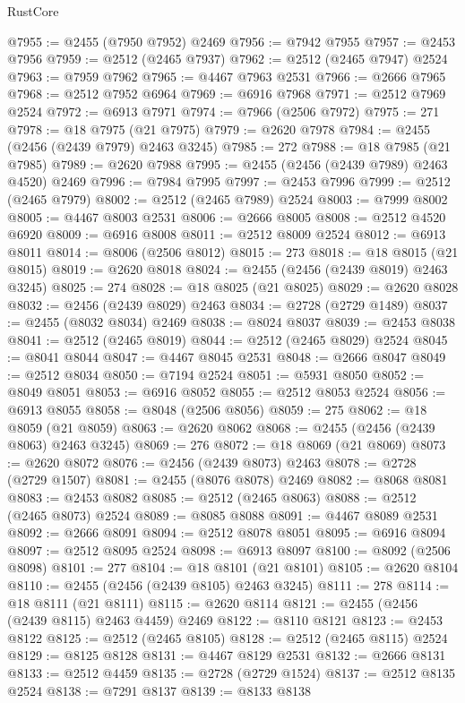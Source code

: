 \begin{lexlean}{RustCore}
\begin{coremodule}
@7955 := @2455 (@7950 @7952) @2469
@7956 := @7942 @7955
@7957 := @2453 @7956
@7959 := @2512 (@2465 @7937)
@7962 := @2512 (@2465 @7947) @2524
@7963 := @7959 @7962
@7965 := @4467 @7963 @2531
@7966 := @2666 @7965
@7968 := @2512 @7952 @6964
@7969 := @6916 @7968
@7971 := @2512 @7969 @2524
@7972 := @6913 @7971
@7974 := @7966 (@2506 @7972)
@7975 := 271
@7978 := @18 @7975 (@21 @7975)
@7979 := @2620 @7978
@7984 := @2455 (@2456 (@2439 @7979) @2463 @3245)
@7985 := 272
@7988 := @18 @7985 (@21 @7985)
@7989 := @2620 @7988
@7995 := @2455 (@2456 (@2439 @7989) @2463 @4520) @2469
@7996 := @7984 @7995
@7997 := @2453 @7996
@7999 := @2512 (@2465 @7979)
@8002 := @2512 (@2465 @7989) @2524
@8003 := @7999 @8002
@8005 := @4467 @8003 @2531
@8006 := @2666 @8005
@8008 := @2512 @4520 @6920
@8009 := @6916 @8008
@8011 := @2512 @8009 @2524
@8012 := @6913 @8011
@8014 := @8006 (@2506 @8012)
@8015 := 273
@8018 := @18 @8015 (@21 @8015)
@8019 := @2620 @8018
@8024 := @2455 (@2456 (@2439 @8019) @2463 @3245)
@8025 := 274
@8028 := @18 @8025 (@21 @8025)
@8029 := @2620 @8028
@8032 := @2456 (@2439 @8029) @2463
@8034 := @2728 (@2729 @1489)
@8037 := @2455 (@8032 @8034) @2469
@8038 := @8024 @8037
@8039 := @2453 @8038
@8041 := @2512 (@2465 @8019)
@8044 := @2512 (@2465 @8029) @2524
@8045 := @8041 @8044
@8047 := @4467 @8045 @2531
@8048 := @2666 @8047
@8049 := @2512 @8034
@8050 := @7194 @2524
@8051 := @5931 @8050
@8052 := @8049 @8051
@8053 := @6916 @8052
@8055 := @2512 @8053 @2524
@8056 := @6913 @8055
@8058 := @8048 (@2506 @8056)
@8059 := 275
@8062 := @18 @8059 (@21 @8059)
@8063 := @2620 @8062
@8068 := @2455 (@2456 (@2439 @8063) @2463 @3245)
@8069 := 276
@8072 := @18 @8069 (@21 @8069)
@8073 := @2620 @8072
@8076 := @2456 (@2439 @8073) @2463
@8078 := @2728 (@2729 @1507)
@8081 := @2455 (@8076 @8078) @2469
@8082 := @8068 @8081
@8083 := @2453 @8082
@8085 := @2512 (@2465 @8063)
@8088 := @2512 (@2465 @8073) @2524
@8089 := @8085 @8088
@8091 := @4467 @8089 @2531
@8092 := @2666 @8091
@8094 := @2512 @8078 @8051
@8095 := @6916 @8094
@8097 := @2512 @8095 @2524
@8098 := @6913 @8097
@8100 := @8092 (@2506 @8098)
@8101 := 277
@8104 := @18 @8101 (@21 @8101)
@8105 := @2620 @8104
@8110 := @2455 (@2456 (@2439 @8105) @2463 @3245)
@8111 := 278
@8114 := @18 @8111 (@21 @8111)
@8115 := @2620 @8114
@8121 := @2455 (@2456 (@2439 @8115) @2463 @4459) @2469
@8122 := @8110 @8121
@8123 := @2453 @8122
@8125 := @2512 (@2465 @8105)
@8128 := @2512 (@2465 @8115) @2524
@8129 := @8125 @8128
@8131 := @4467 @8129 @2531
@8132 := @2666 @8131
@8133 := @2512 @4459
@8135 := @2728 (@2729 @1524)
@8137 := @2512 @8135 @2524
@8138 := @7291 @8137
@8139 := @8133 @8138

\end{coremodule}
\end{lexlean}
